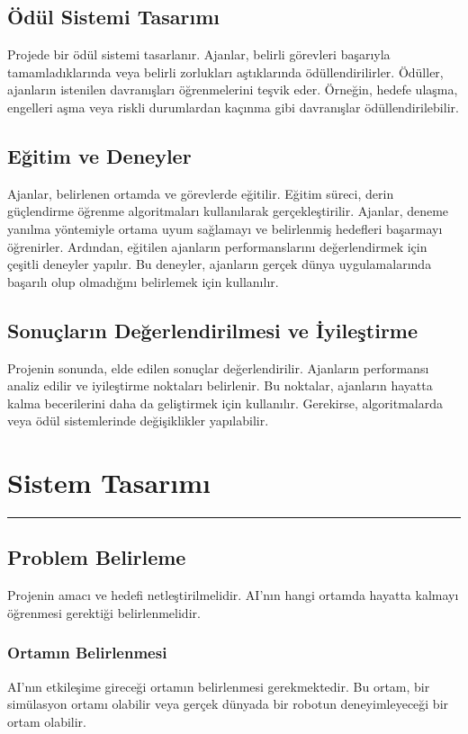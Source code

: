 \documentclass{article}
\begin{document}
\subsection{Ödül Sistemi Tasarımı}
Projede bir ödül sistemi tasarlanır. Ajanlar, belirli görevleri başarıyla tamamladıklarında veya belirli zorlukları aştıklarında ödüllendirilirler. Ödüller, ajanların istenilen davranışları öğrenmelerini teşvik eder. Örneğin, hedefe ulaşma, engelleri aşma veya riskli durumlardan kaçınma gibi davranışlar ödüllendirilebilir.
\subsection{Eğitim ve Deneyler}
Ajanlar, belirlenen ortamda ve görevlerde eğitilir. Eğitim süreci, derin güçlendirme öğrenme algoritmaları kullanılarak gerçekleştirilir. Ajanlar, deneme yanılma yöntemiyle ortama uyum sağlamayı ve belirlenmiş hedefleri başarmayı öğrenirler. Ardından, eğitilen ajanların performanslarını değerlendirmek için çeşitli deneyler yapılır. Bu deneyler, ajanların gerçek dünya uygulamalarında başarılı olup olmadığını belirlemek için kullanılır.
\subsection{Sonuçların Değerlendirilmesi ve İyileştirme}
Projenin sonunda, elde edilen sonuçlar değerlendirilir. Ajanların performansı analiz edilir ve iyileştirme noktaları belirlenir. Bu noktalar, ajanların hayatta kalma becerilerini daha da geliştirmek için kullanılır. Gerekirse, algoritmalarda veya ödül sistemlerinde değişiklikler yapılabilir.
\newpage

\section{Sistem Tasarımı}
\rule{\textwidth}{0.5pt}
\subsection{Problem Belirleme}
Projenin amacı ve hedefi netleştirilmelidir. AI'nın hangi ortamda hayatta kalmayı öğrenmesi gerektiği belirlenmelidir.
\subsubsection{Ortamın Belirlenmesi}
AI'nın etkileşime gireceği ortamın belirlenmesi gerekmektedir. Bu ortam, bir simülasyon ortamı olabilir veya gerçek dünyada bir robotun deneyimleyeceği bir ortam olabilir.
\end{document}
